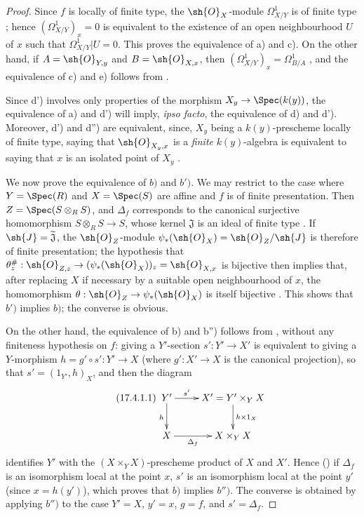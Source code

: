 \begin{proof}
Since $f$ is locally of finite type, the $\sh{O}_X$-module $\Omega^1_{X/Y}$ is of finite type ; hence $(\Omega^1_{X/Y})_x=0$ is equivalent to the existence of an open neighbourhood $U$ of $x$ such that $\Omega^1_{X/Y}|U=0$.
This proves the equivalence of a) and c).
On the other hand, if $A=\sh{O}_{Y,y}$ and $B=\sh{O}_{X,x}$, then $(\Omega^1_{X/Y})_x=\Omega^1_{B/A}$ , and the equivalence of c) and e) follows from .

Since d') involves only properties of the morphism $X_y\to\Spec(k(y))$, the equivalence of a) and d') will imply, \emph{ipso facto}, the equivalence of d) and d').
Moreover, d') and d'') are equivalent, since, $X_y$ being a $k(y)$-prescheme locally of finite type, saying that $\sh{O}_{X_y,x}$ is a \emph{finite} $k(y)$-algebra is equivalent to saying that $x$ is an isolated point of $X_y$ .

We now prove the equivalence of $b)$ and $b')$.
We may restrict to the case where $Y=\Spec(R)$ and $X=\Spec(S)$ are affine and $f$ is of finite presentation. Then $Z=\Spec(S\otimes_R S)$, and $\Delta_f$ corresponds to the canonical surjective homomorphism $S\otimes_R S\to S$, whose kernel $\mathfrak{J}$ is an ideal of finite type . If $\sh{J}=\widetilde{\mathfrak{J}}$, the $\sh{O}_Z$-module $\psi_*(\sh{O}_X)=\sh{O}_Z/\sh{J}$ is therefore of finite presentation; the hypothesis that $\theta_z^\#:\sh{O}_{Z,z}\to(\psi_*(\sh{O}_X))_z=\sh{O}_{X,x}$ is bijective then implies that, after replacing $X$ if necessary by a suitable open neighbourhood of $x$, the homomorphism $\theta:\sh{O}_Z\to\psi_*(\sh{O}_X)$ is itself bijective .
This shows that $b')$ implies $b)$; the converse is obvious.

On the other hand, the equivalence of b) and b'') follows from , without any finiteness hypothesis on $f$: giving a $Y'$-section $s':Y'\to X'$ is equivalent to giving a
$Y$-morphism $h=g'\circ s':Y'\to X$ (where $g':X'\to X$ is the canonical projection), so that $s'=(1_{Y'},h)_X$, and then the diagram
\[
\tag{17.4.1.1}
\label{IV.17.4.1.1}
\xymatrix{
Y' \ar[r]^-{s'} \ar[d]_h & X'=Y'\times_Y X \ar[d]^{h\times 1_X}\\
X \ar[r]_-{\Delta_f} & X\times_Y X
}
\]
identifies $Y'$ with the $(X\times_Y X)$-prescheme product of $X$ and $X'$.
Hence () if $\Delta_f$ is an isomorphism local at the point $x$, $s'$ is an isomorphism local at the point $y'$ (since $x=h(y')$), which proves that $b)$ implies $b'')$.
The converse is obtained by applying $b'')$ to the case $Y'=X$, $y'=x$, $g=f$, and $s'=\Delta_f$.


\end{proof}
